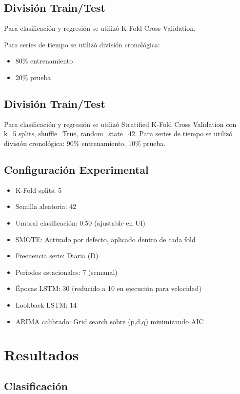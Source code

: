 \documentclass[12pt]{article}
\begin{document}
\subsection{División Train/Test}

Para clasificación y regresión se utilizó K-Fold Cross Validation.

Para series de tiempo se utilizó división cronológica:

\begin{itemize}
\item 80\% entrenamiento
\item 20\% prueba
\end{itemize}

\subsection{División Train/Test}
Para clasificación y regresión se utilizó Stratified K-Fold Cross Validation con k=5 splits, shuffle=True, random\_state=42.
Para series de tiempo se utilizó división cronológica: 90\% entrenamiento, 10\% prueba.

\subsection{Configuración Experimental}
\begin{itemize}
\item K-Fold splits: 5
\item Semilla aleatoria: 42
\item Umbral clasificación: 0.50 (ajustable en UI)
\item SMOTE: Activado por defecto, aplicado dentro de cada fold
\item Frecuencia serie: Diaria (D)
\item Periodos estacionales: 7 (semanal)
\item Épocas LSTM: 30 (reducido a 10 en ejecución para velocidad)
\item Lookback LSTM: 14
\item ARIMA calibrado: Grid search sobre (p,d,q) minimizando AIC
\end{itemize}

\section{Resultados}

\subsection{Clasificación}
\end{document}
